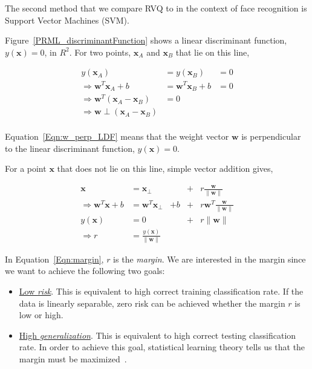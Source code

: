 \begin{Body}
The second method that we compare RVQ to in the context of face recognition is Support Vector Machines (SVM).  

Figure~\ref{PRML_discriminantFunction} shows a linear discriminant function, $y(\mathbf{x})=0$, in $R^2$.  For two points, $\mathbf{x}_A$ and $\mathbf{x}_B$ that lie on this line,

\begin{equation}
\begin{array}{lll}
y(\textbf{x}_A)					&=		y(\textbf{x}_B)					&=0\\
\Rightarrow \mathbf{w}^T\mathbf{x}_A+b	&=		\mathbf{w}^T\mathbf{x}_B+b	&=0\\
\Rightarrow \mathbf{w}^T(\mathbf{x}_A-\mathbf{x}_B)			&=0\\
\Rightarrow \mathbf{w} \perp (\mathbf{x}_A-\mathbf{x}_B)\\
\end{array}
\label{Eqn:w_perp_LDF}
\end{equation}

Equation~\ref{Eqn:w_perp_LDF} means that the weight vector $\mathbf{w}$ is perpendicular to the linear discriminant function, $y(\mathbf{x})=0$.  

For a point $\mathbf{x}$ that does not lie on this line, simple vector addition gives,

\begin{equation}
\begin{array}{clllll}
\mathbf{x}		&=\mathbf{x}_{\perp} &&+ &r\frac{\mathbf{w}}{\|\mathbf{w}\|}\\
\Rightarrow \mathbf{w}^T\mathbf{x} +b		&=\mathbf{w}^T\mathbf{x}_{\perp} &+ b &+ &r \mathbf{w}^T \frac{\mathbf{w}}{\|\mathbf{w}\|}\\
y(\mathbf{x}) &= 0 && + &r\|\mathbf{w}\|\\
\Rightarrow r&=\frac{y(\mathbf{x})}{\|\mathbf{w}\|}
\end{array}
\label{Eqn:margin}
\end{equation}

In Equation~\ref{Eqn:margin}, $r$ is the \emph{margin}.  We are interested in the margin since we want to achieve the following two goals:

\begin{itemize}
\item \underline{Low \emph{risk}}.  This is equivalent to high correct training classification rate.  If the data is linearly separable, zero risk can be achieved whether the margin $r$ is low or high.
\item \underline{High \emph{generalization}}.  This is equivalent to high correct testing classification rate.  In order to achieve this goal, statistical learning theory tells us that the margin must be maximized~\cite{1996_BOOK_PR_DevroyeGyorfiLugosi}.
\end{itemize}


\end{Body}
